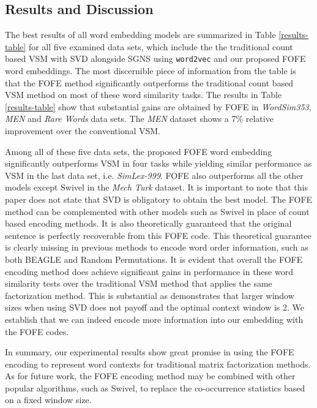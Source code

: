 \documentclass[11pt,letterpaper]{article}
\begin{document}
\subsection{Results and Discussion}

\label{ssec:Results and Discussion}

The best results of all word embedding models are summarized in Table \ref{results-table} for all five examined data sets, which include the the traditional count based VSM with SVD alongside SGNS using {\small\verb|word2vec|} and our proposed FOFE word embeddings. The most discernible piece of information from the table is that the FOFE method significantly outperforms the traditional count based VSM method on most of these word similarity tasks. The results in Table \ref{results-table} show that substantial gains are obtained by FOFE in {\em WordSim353}, {\em MEN} and {\em Rare Words} data sets. The {\em MEN} dataset shows a 7\% relative improvement over the conventional VSM. 

Among all of these five data sets, the proposed FOFE word embedding significantly outperforms VSM in four tasks while yielding similar performance as VSM in the last data set, i.e. {\em SimLex-999}. FOFE also outperforms all the other models except Swivel in the {\em Mech Turk} dataset. It is important to note that this paper does not state that SVD is obligatory to obtain the best model. 
The FOFE method can be complemented with other models such as Swivel in place of count based encoding methods. It is also theoretically guaranteed that the original sentence is perfectly recoverable from this FOFE code. This theoretical guarantee is clearly missing in previous methods to encode word order information, such as both BEAGLE and Random Permutations. It is evident that overall the FOFE encoding method does achieve significant gains in performance in these word similarity tests over the traditional VSM method that applies the same factorization method. This is substantial as  \cite{Levy} demonstrates that larger window sizes when using SVD does not payoff and the optimal context window is 2. We establish that we can indeed encode more information into our embedding with the FOFE codes. 

In summary, our experimental results show great promise in using the FOFE encoding to represent word contexts for traditional matrix factorization methods. As for future work, the FOFE encoding method may be combined with other popular algorithms, such as Swivel, to  replace the co-occurrence statistics based on a fixed window size.   
\end{document}
